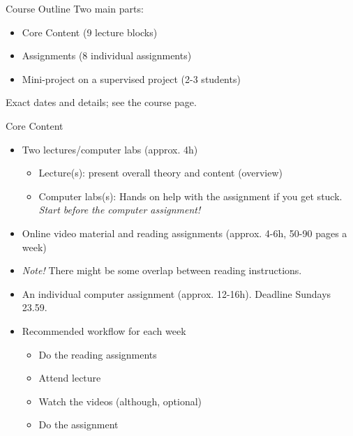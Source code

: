 \documentclass[10pt,handout]{beamer}
\begin{document}
\begin{frame}{Course Outline}
Two main parts:
\begin{itemize}
\item Core Content (9 lecture blocks)\pause
\item Assignments (8 individual assignments)\pause
\item Mini-project on a supervised project (2-3 students)\pause
\end{itemize}
Exact dates and details; see the course page.
\end{frame}

\begin{frame}{Core Content}

\begin{itemize}
\item Two lectures/computer labs (approx. 4h)
\begin{itemize}
\item Lecture(s): present overall theory and content (overview)
\item Computer labs(s): Hands on help with the assignment if you get stuck. \emph{Start before the computer assignment!}
\end{itemize}
\item Online video material and reading assignments (approx. 4-6h, 50-90 pages a week)
\item \emph{Note!} There might be some overlap between reading instructions.
\item An individual computer assignment (approx. 12-16h). Deadline Sundays 23.59.\pause
\item Recommended workflow for each week
\begin{itemize}
\item Do the reading assignments
\item Attend lecture
\item Watch the videos (although, optional)
\item Do the assignment
\end{itemize}
\end{itemize}

\end{frame}

\end{document}
